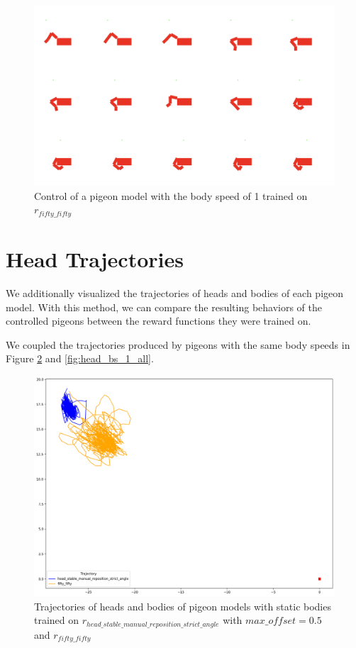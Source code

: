   \begin{figure}[H]
      \centering
      \includegraphics[width=1\textwidth]{figures/frames/frames_005.png}
      \caption{Control of a pigeon model with the body speed of 1 trained on $r_{fifty\_fifty}$}
      \label{fig:fifty_fifty_body_speed_1}
  \end{figure}

\section{Head Trajectories}
  We additionally visualized the trajectories of heads and bodies of each pigeon model. With this method, we can compare the resulting behaviors of the controlled pigeons between the reward functions they were trained on.

  We coupled the trajectories produced by pigeons with the same body speeds in Figure \ref{fig:head_bs_0} and \ref{fig:head_bs_1_all}.

  \begin{figure}[H]
      \centering
      \includegraphics[width=1\textwidth]{figures/head_tracking_results/pigeon_bs_0.png}
      \caption{Trajectories of heads and bodies of pigeon models with static bodies trained on $r_{head\_stable\_manual\_reposition\_strict\_angle}$ with $max\_offset = 0.5$ and $r_{fifty\_fifty}$}
      \label{fig:head_bs_0}
  \end{figure}

